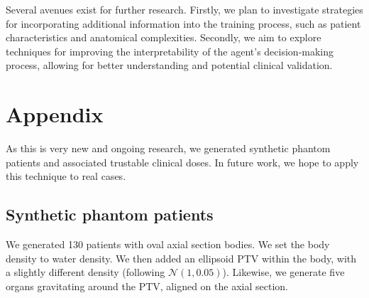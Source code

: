 Several avenues exist for further research.
Firstly, we plan to investigate strategies for incorporating additional information into the training process, such as patient characteristics and anatomical complexities.
Secondly, we aim to explore techniques for improving the interpretability of the agent's decision-making process, allowing for better understanding and potential clinical validation.



\section*{Appendix}
As this is very new and ongoing research, we generated synthetic phantom patients and associated trustable clinical doses.
In future work, we hope to apply this technique to real cases.

\subsection*{Synthetic phantom patients}
We generated 130 patients with oval axial section bodies.
We set the body density to water density.
We then added an ellipsoid PTV within the body, with a slightly different density (following $\mathcal{N}(1,0.05)$).
Likewise, we generate five organs gravitating around the PTV, aligned on the axial section.

